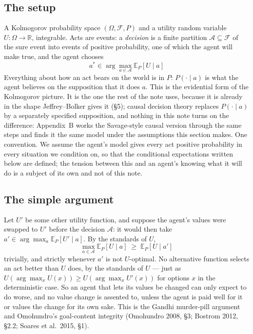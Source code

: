 \documentclass[11pt,a4paper]{article}
\begin{document}
\subsection{The setup}
A Kolmogorov probability space $(\Omega, \mathcal F, P)$ and a utility random variable $U : \Omega \to \mathbb R$, integrable. Acts are events: a \emph{decision} is a finite partition $\mathcal A \subseteq \mathcal F$ of the sure event into events of positive probability, one of which the agent will make true, and the agent chooses
\[
a^* \in \arg\max_{a \in \mathcal A} \mathbb E_P[ U \mid a]
\]
Everything about how an act bears on the world is in $P$: $P(\cdot \mid a)$ is what the agent believes on the supposition that it does $a$. This is the evidential form of the Kolmogorov picture. It is the one the rest of the note uses, because it is already in the shape Jeffrey--Bolker gives it (\S5); causal decision theory replaces $P(\cdot \mid a)$ by a separately specified supposition, and nothing in this note turns on the difference: Appendix~B works the Savage-style causal version through the same steps and finds it the same model under the assumptions this section makes. One convention. We assume the agent's model gives every act positive probability in every situation we condition on, so that the conditional expectations written below are defined; the tension between this and an agent's knowing what it will do is a subject of its own and not of this note.

\subsection{The simple argument}
Let $U'$ be some other utility function, and suppose the agent's values were swapped to $U'$ before the decision $\mathcal A$: it would then take $a' \in \arg\max_a \mathbb E_P[ U' \mid a]$. By the standards of $U$,
\[
\max_{a \in \mathcal A} \mathbb E_P[ U \mid a] \;\ge\; \mathbb E_P[ U \mid a']
\]
trivially, and strictly whenever $a'$ is not $U$-optimal. No alternative function selects an act better than $U$ does, by the standards of $U$ --- just as $U(\arg\max_x U(x)) \ge U(\arg\max_x U'(x))$ for options $x$ in the deterministic case. So an agent that lets its values be changed can only expect to do worse, and no value change is assented to, unless the agent is paid well for it or values the change for its own sake. This is the Gandhi murder-pill argument and Omohundro's goal-content integrity (Omohundro 2008, \S3; Bostrom 2012, \S2.2; Soares et al.\ 2015, \S1).
\end{document}

